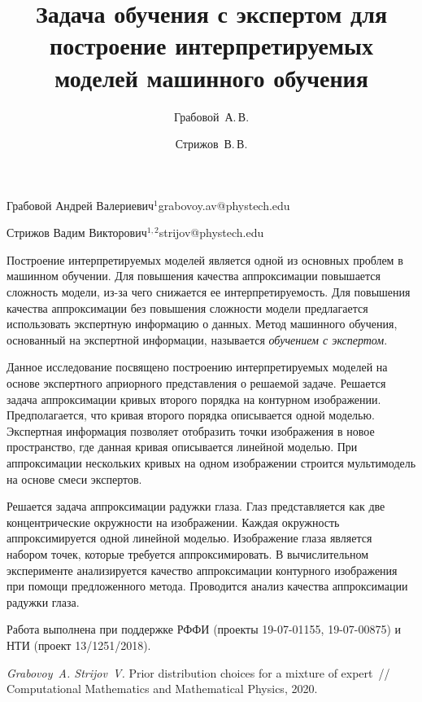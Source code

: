 \documentclass[twoside]{article}
\begin{document}
\Russian
\title{Задача обучения с экспертом для построение интерпретируемых моделей машинного обучения}
\author{Грабовой~А.\,В.}{Грабовой Андрей Валериевич$^{1}$\speaker}{grabovoy.av@phystech.edu}
\author{Стрижов~В.\,В.}{Стрижов Вадим Викторович$^{1,2}$}{strijov@phystech.edu}
\maketitle

Построение интерпретируемых моделей является одной из основных проблем в машинном обучении. Для повышения качества аппроксимации повышается сложность модели, из-за чего снижается ее интерпретируемость. Для повышения качества аппроксимации без повышения сложности модели предлагается использовать экспертную информацию о данных. Метод машинного обучения, основанный на экспертной информации, называется \textit{обучением с экспертом}.

Данное исследование посвящено построению интерпретируемых моделей на основе экспертного априорного представления о решаемой задаче. Решается задача аппроксимации кривых второго порядка на контурном изображении. Предполагается, что кривая второго порядка описывается одной моделью. Экспертная информация позволяет отобразить точки изображения в новое пространство, где данная кривая описывается линейной моделью. При аппроксимации нескольких кривых на одном изображении строится мультимодель на основе смеси экспертов.

Решается задача аппроксимации радужки глаза. Глаз представляется как две концентрические окружности на изображении. Каждая окружность аппроксимируется одной линейной моделью. Изображение глаза является набором точек, которые требуется аппроксимировать. В вычислительном эксперименте анализируется качество аппроксимации контурного изображения при помощи предложенного метода. Проводится анализ качества аппроксимации радужки глаза. 

Работа выполнена при поддержке РФФИ (проекты 19-07-01155, 19-07-00875) и НТИ (проект 13/1251/2018).

\begin{thebibliography}{1}
    \emph{Grabovoy~A.  Strijov~V.}
    Prior distribution choices for a mixture of expert~// Computational Mathematics and Mathematical Physics, 2020.
\end{thebibliography}
\end{document}
